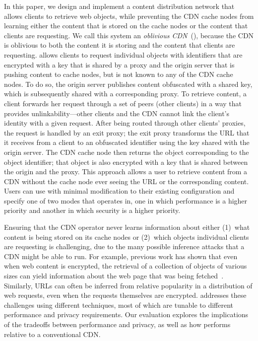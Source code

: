 In this paper, we design and implement a content distribution network that
allows clients to retrieve web objects, while preventing the CDN cache nodes
from learning either the content that is stored on the cache nodes or the
content that clients are requesting. We call this system an {\em oblivious
CDN}~(\system{}), because the CDN is oblivious to both the content it is
storing and the content that clients are requesting. \system{} allows clients to
request individual objects with identifiers that are encrypted with a key that
is shared by a proxy and the origin server that is pushing content to
cache nodes, but is not known to any of the CDN cache nodes.  To do so, the
origin server publishes content obfuscated with a shared key, which is subsequently 
shared with a corresponding proxy. To retrieve content, a client forwards her request 
through a set of peers (other clients) in a way that provides unlinkability---other clients 
and the CDN cannot link the client's identity with a given request.  After being routed 
through other clients' proxies, the request is handled by an exit proxy; the exit proxy 
transforms the URL that it receives
from a client to an obfuscated identifier using the key shared with the origin
server. The CDN cache node then returns the object corresponding to the object
identifier; that object is also encrypted with a key that is shared between
the origin and the proxy. This approach allows a user to retrieve content from
a CDN without the cache node ever seeing the URL or the corresponding content.
Users can use \system{} with minimal modification to their existing configuration and
specify one of two modes that \system{} operates in, one in which performance is a higher 
priority and another in which security is a higher priority.

Ensuring that the CDN operator never
learns information about either (1)~what content is being stored on its cache
nodes or (2)~which objects individual clients are requesting is
challenging, due to the many possible inference attacks that a CDN might be
able to run. For example, previous work has shown that even when web content
is encrypted, the retrieval of a collection of objects of various sizes can
yield information about the web page that was being fetched~\cite{panchenko2016website,
cai2012touching}. Similarly, URLs
can often be inferred from relative popularity in a distribution of web
requests, even when the requests themselves are encrypted. \system{} addresses
these challenges using different techniques, most of which are tunable to different 
performance and privacy requirements.  Our evaluation explores the implications of 
the tradeoffs between performance and privacy, as
well as how \system{} performs relative to a conventional CDN.


